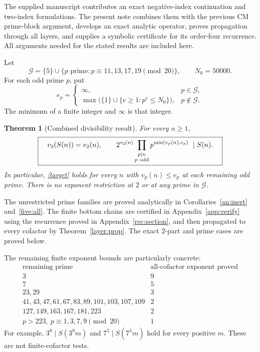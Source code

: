 \documentclass[11pt,a4paper]{article}
\newtheorem{theorem}{Theorem}[section]
\theoremstyle{remark}\newtheorem{remark}[theorem]{Remark}
\begin{document}
The supplied manuscript \cite{Supplied} contributes an exact
negative-index continuation and two-index formulations. The present
note combines them with the previous CM prime-block argument, develops
an exact analytic operator, proves propagation through all layers,
and supplies a symbolic certificate for its order-four recurrence.
All arguments needed for the stated results are included here.

Let
\[
 \mathcal G=\{5\}\cup
 \{p\text{ prime}:p\equiv11,13,17,19\pmod{20}\},\qquad N_0=50000.
\]
For each odd prime \(p\), put
\[
 e_p=
 \begin{cases}
 \infty,&p\in\mathcal G,\\
 \max\bigl(\{1\}\cup\{e\ge1:p^e\le N_0\}\bigr),&p\notin\mathcal G.
 \end{cases}
\]
The minimum of a finite integer and \(\infty\) is that integer.

\begin{theorem}[Combined divisibility result]\label{main}
For every \(n\ge1\),
\[
 \boxed{\quad
 v_2(S(n))=v_2(n),\qquad
 2^{v_2(n)}
 \prod_{\substack{p\mid n\\p\ {\rm odd}}}
 p^{\min(v_p(n),e_p)}\ \mid S(n).
 \quad}
\]
In particular, \eqref{target} holds for every \(n\) with
\(v_p(n)\le e_p\) at each remaining odd prime. There is no exponent
restriction at \(2\) or at any prime in \(\mathcal G\).
\end{theorem}

The unrestricted prime families are proved analytically in
Corollaries~\ref{an:inert} and~\ref{five:all}.
The finite bottom chains are certified in Appendix~\ref{app:verify}
using the recurrence proved in Appendix~\ref{rec:section}, and then
propagated to every cofactor by Theorem~\ref{layer:prop}.
The exact \(2\)-part and prime cases are proved below.

The remaining finite exponent bounds are particularly concrete:
\[
\begin{array}{c|c}
\text{remaining prime}&\text{all-cofactor exponent proved}\\ \hline
3&9\\
7&5\\
23,29&3\\
41,43,47,61,67,83,89,101,103,107,109&2\\
127,149,163,167,181,223&2\\
p>223,\ p\equiv1,3,7,9\pmod{20}&1
\end{array}
\]
For example, \(3^9\mid S(3^9m)\) and \(7^5\mid S(7^5m)\)
hold for every positive \(m\). These are not finite-cofactor tests.
\end{document}
